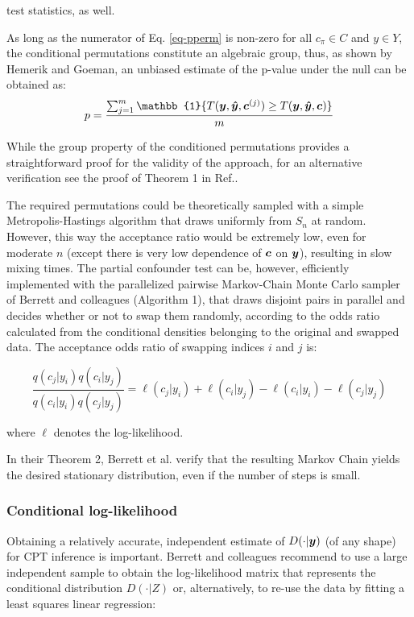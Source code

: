 \documentclass{article}
\begin{document}
test statistics, as well.

As long as the numerator of Eq. \ref{eq-pperm} is non-zero for all $c_\pi \in C$ and $y \in Y$, the conditional permutations constitute an algebraic group, thus, as shown by Hemerik and Goeman\citep{hemerik2018exact}, an unbiased estimate of the p-value under the null can be obtained as:
$$ p= \frac{\sum_{j=1}^m \mathbb{1} \{T(\y, \yhat, \c^{(j)}) \geq T(\y, \yhat, \c) \}  }{m}$$

While the group property of the conditioned permutations provides a straightforward proof for the validity of the approach, for an alternative verification see the proof of Theorem 1 in Ref.\citep{berrett2020conditional}.

The required permutations could be theoretically sampled with a simple Metropolis-Hastings algorithm that draws uniformly from $S_n$ at random. However, this way the acceptance ratio would be extremely low, even for moderate $n$ (except there is very low dependence of $\boldsymbol{c}$ on $\boldsymbol{y}$), resulting in slow mixing times. The partial confounder test can be, however, efficiently implemented with the parallelized pairwise Markov-Chain Monte Carlo sampler of Berrett and colleagues\cite{berrett2020conditional} (Algorithm 1), that draws disjoint pairs in parallel and decides whether or not to swap them randomly, according to the odds ratio calculated from the conditional densities belonging to the original and swapped data. The acceptance odds ratio of swapping indices $i$ and $j$ is:

\begin{equation}
\frac{ q(c_j | y_i) q(c_i | y_j)}{q(c_i | y_i) q(c_j | y_j) }
=
\ell(c_j | y_i) + \ell(c_i | y_j) - \ell(c_i | y_i) - \ell(c_j | y_j) 
\label{eq:accept-odds}
\end{equation}

where $\ell$ denotes the log-likelihood.

In their Theorem 2, Berrett et al.\cite{berrett2020conditional} verify that the resulting Markov Chain yields the desired stationary distribution, even if the number of steps is small.

\subsubsection*{Conditional log-likelihood}


Obtaining a relatively accurate, independent estimate of $D(\cdot|\boldsymbol{y})$ (of any shape) for CPT inference is important. Berrett and colleagues recommend to use a large independent sample to obtain the log-likelihood matrix that represents the conditional distribution $D(\cdot|Z)$ or, alternatively, to re-use the data by fitting a least squares linear regression:
\end{document}
